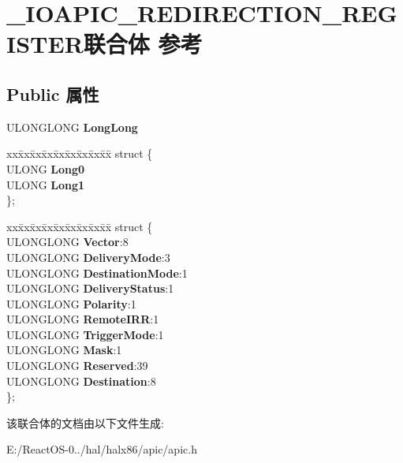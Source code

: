 \hypertarget{union___i_o_a_p_i_c___r_e_d_i_r_e_c_t_i_o_n___r_e_g_i_s_t_e_r}{}\section{\+\_\+\+I\+O\+A\+P\+I\+C\+\_\+\+R\+E\+D\+I\+R\+E\+C\+T\+I\+O\+N\+\_\+\+R\+E\+G\+I\+S\+T\+E\+R联合体 参考}
\label{union___i_o_a_p_i_c___r_e_d_i_r_e_c_t_i_o_n___r_e_g_i_s_t_e_r}
\subsection*{Public 属性}
\begin{DoxyCompactItemize}
\item 
\mbox{\label{union___i_o_a_p_i_c___r_e_d_i_r_e_c_t_i_o_n___r_e_g_i_s_t_e_r_ad0814f84b66c233fc6b6472cab6a2829}} 
U\+L\+O\+N\+G\+L\+O\+NG {\bfseries Long\+Long}
\item 
\mbox{\label{union___i_o_a_p_i_c___r_e_d_i_r_e_c_t_i_o_n___r_e_g_i_s_t_e_r_a3fd7222312964e410fda72189d05290a}} 
\begin{tabbing}
xx\=xx\=xx\=xx\=xx\=xx\=xx\=xx\=xx\=\kill
struct \{\\
\>ULONG {\bfseries Long0}\\
\>ULONG {\bfseries Long1}\\
\}; \\

\end{tabbing}\item 
\mbox{\label{union___i_o_a_p_i_c___r_e_d_i_r_e_c_t_i_o_n___r_e_g_i_s_t_e_r_a4ffadccad5fb6f9a6d50fd4404097a90}} 
\begin{tabbing}
xx\=xx\=xx\=xx\=xx\=xx\=xx\=xx\=xx\=\kill
struct \{\\
\>ULONGLONG {\bfseries Vector}:8\\
\>ULONGLONG {\bfseries DeliveryMode}:3\\
\>ULONGLONG {\bfseries DestinationMode}:1\\
\>ULONGLONG {\bfseries DeliveryStatus}:1\\
\>ULONGLONG {\bfseries Polarity}:1\\
\>ULONGLONG {\bfseries RemoteIRR}:1\\
\>ULONGLONG {\bfseries TriggerMode}:1\\
\>ULONGLONG {\bfseries Mask}:1\\
\>ULONGLONG {\bfseries Reserved}:39\\
\>ULONGLONG {\bfseries Destination}:8\\
\}; \\

\end{tabbing}\end{DoxyCompactItemize}


该联合体的文档由以下文件生成\+:\begin{DoxyCompactItemize}
\item 
E\+:/\+React\+O\+S-\/0../hal/halx86/apic/apic.\+h\end{DoxyCompactItemize}
